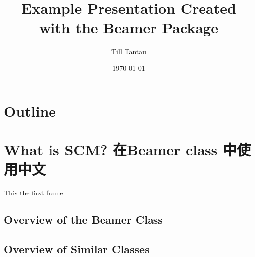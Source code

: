 \documentclass[CJK]{beamer}
\date{\today}
\begin{document}
\begin{CJK}{UTF8}{nkai}
\title{Example Presentation Created with the Beamer Package}
\author{Till Tantau}

\begin{frame}
\titlepage
\end{frame}
\section*{Outline}
\begin{frame}
\tableofcontents
\end{frame}

\section{What is SCM? 在Beamer class 中使用中文}

\begin{frame}
    This the first frame
\end{frame}
\subsection{Overview of the Beamer Class}
\subsection{Overview of Similar Classes}
\end{CJK}
\end{document}
